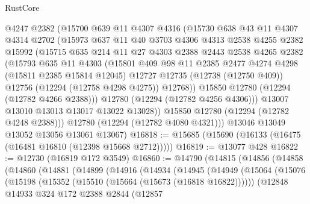 \begin{lexlean}{RustCore}
\begin{coremodule}
          @4247
          @2382
          (@15700
            @639
            @11
            @4307
            @4316
            (@15730
              @638
              @43
              @11
              @4307
              @4314
              @2702
              (@15973
                @637
                @11
                @40
                @3703
                @4306
                @4313
                @2538
                @4255
                @2382
                @15992
                (@15715
                  @635
                  @214
                  @11
                  @27
                  @4303
                  @2388
                  @2443
                  @2538
                  @4265
                  @2382
                  (@15793
                    @635
                    @11
                    @4303
                    (@15801
                      @409
                      @98
                      @11
                      @2385
                      @2477
                      @4274
                      @4298
                      (@15811 @2385 @15814 @12045)
                      @12727
                      @12735
                      (@12738 (@12750 @409))
                      @12756
                      (@12294 (@12758 @4298 @4275))
                      @12768))
                  @15850
                  @12780
                  (@12294 (@12782 @4266 @2388)))
                @12780
                (@12294 (@12782 @4256 @4306)))
              @13007
              @13010
              @13013
              @13017
              @13022
              @13028))
          @15850
          @12780
          (@12294 (@12782 @4248 @2388)))
        @12780
        (@12294 (@12782 @4080 @4321)))
      @13046
      @13049
      @13052
      @13056
      @13061
      @13067)
@16818 := @15685 (@15690 (@16133 (@16475 (@16481 @16810 (@12398 @15668 @2712)))))
@16819 := @13077 @428
@16822 := @12730 (@16819 @172 @3549)
@16860 := @14790
    (@14815
      (@14856
        (@14858
          (@14860
            (@14881
              (@14899
                (@14916
                  (@14934
                    (@14945
                      (@14949
                        (@15064
                          (@15076
                            (@15198 (@15352 (@15510 (@15664 (@15673 (@16818 @16822))))))
                            (@12848
                              @14933
                              @324
                              @172
                              @2388
                              @2844
                              (@12857

\end{coremodule}
\end{lexlean}

